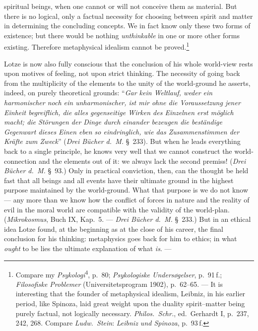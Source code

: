 \documentclass[12pt,a4paper]{book}
\newcommand{\opage}[1]{\marginnote{\footnotesize\textit{[#1]}}}
\begin{document}
spiritual beings, when one cannot or will not conceive them as material. But
there is no logical, only a factual necessity for choosing between spirit and
matter in determining the concluding concepts. We in fact know only these two
forms of existence; but there would be nothing \emph{unthinkable} in one or more
other forms existing. Therefore metaphysical idealism cannot be
proved.\footnote{Compare my \textit{Psykologi}\textsuperscript{4}, p.~80;
\textit{Psykologiske Undersøgelser}, p.~91\,f.; \textit{Filosofiske Problemer}
(Universitetsprogram 1902), p.~62--65. --- \opage{599}It is interesting that the founder of
metaphysical idealism, Leibniz, in his earlier period, like Spinoza, laid great
weight upon the duality spirit--matter being purely factual, not logically
necessary. \textit{Philos.\ Schr.}, ed.\ Gerhardt I, p.~237, 242, 268. Compare
\emph{Ludw.\ Stein}: \textit{Leibniz und Spinoza}, p.~93\,f.}

Lotze is now also fully conscious that the conclusion of his whole world-view
rests upon motives of feeling, not upon strict thinking. The necessity of going
back from the multiplicity of the elements to the unity of the world-ground he
asserts, indeed, on purely theoretical grounds: ``\textit{Gar kein Weltlauf,
weder ein harmonischer noch ein unharmonischer, ist mir ohne die Voraussetzung
jener Einheit begreiflich, die alles gegenseitige \opage{521}Wirken des Einzelnen erst
möglich macht; die Störungen der Dinge durch einander bezeugen die beständige
Gegenwart dieses Einen eben so eindringlich, wie das Zusammenstimmen der Kräfte
zum Zweck}'' (\textit{Drei Bücher d.~M.} §~233). But when he leads everything
back to a single principle, he knows very well that we cannot construct the
world-connection and the elements out of it: we always lack the second premiss!
(\textit{Drei Bücher d.~M.} §~93.) Only in practical conviction, then, can the
thought be held fast that all beings and all events have their ultimate ground in
the highest purpose maintained by the world-ground. What that purpose is we do
not know --- any more than we know how the conflict of forces in nature and the
reality of evil in the moral world are compatible with the validity of the
world-plan. (\textit{Mikrokosmus}, Buch IX, Kap.~5. --- \textit{Drei Bücher
d.~M.} §~233.) But in an ethical idea Lotze found, at the beginning as at the
close of his career, the final conclusion for his thinking: metaphysics goes back
for him to ethics; in what \emph{ought} to be lies the ultimate explanation of
what \emph{is}. ---
\end{document}
